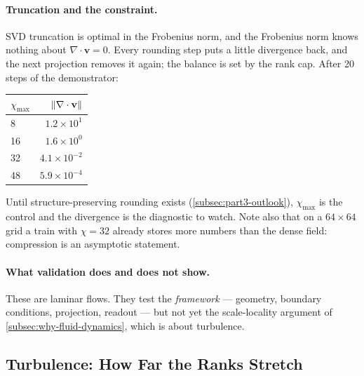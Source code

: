 \paragraph{Truncation and the constraint.}
SVD truncation is optimal in the Frobenius norm, and the Frobenius norm knows
nothing about $\nabla\cdot\mathbf{v}=0$. Every rounding step puts a little
divergence back, and the next projection removes it again; the balance is set by
the rank cap. After 20 steps of the demonstrator:
\begin{center}
  \begin{tabular}{@{}lr@{}}
    \toprule
    $\chi_{\max}$ & $\left\|\nabla\cdot\mathbf{v}\right\|$ \\
    \midrule
    8  & $1.2\times10^{1}$ \\
    16 & $1.6\times10^{0}$ \\
    32 & $4.1\times10^{-2}$ \\
    48 & $5.9\times10^{-4}$ \\
    \bottomrule
  \end{tabular}
\end{center}
\noindent
Until structure-preserving rounding exists (\cref{subsec:part3-outlook}),
$\chi_{\max}$ is the control and the divergence is the diagnostic to watch.
Note also that on a $64\times64$ grid a train with $\chi=32$ already stores more
numbers than the dense field: compression is an asymptotic statement.

\paragraph{What validation does and does not show.}
These are laminar flows. They test the \emph{framework} --- geometry, boundary
conditions, projection, readout --- but not yet the scale-locality argument of
\cref{subsec:why-fluid-dynamics}, which is about turbulence.

\subsection{Turbulence: How Far the Ranks Stretch}
\label{subsec:expressivity}


